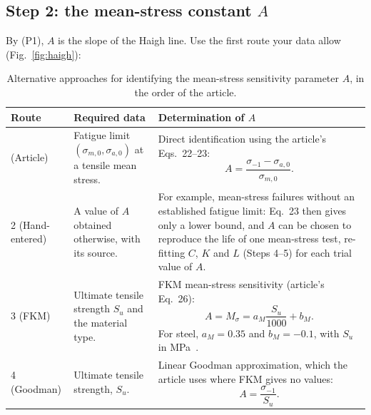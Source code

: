 \documentclass[11pt,a4paper]{article}
\newcommand{\sigm}{\sigma_{-1}}
\newcommand{\Su}{S_u}
\begin{document}
\subsection*{Step 2: the mean-stress constant $A$}
\FloatBarrier
By (P1), $A$ is the slope of the Haigh line. Use the first route your data allow (Fig.~\ref{fig:haigh}):
\begin{table}[h]
\centering
\caption{Alternative approaches for identifying the
mean-stress sensitivity parameter $A$, in the order of the article.}
\label{tab:mean_stress_identification}

\renewcommand{\arraystretch}{1.35}
\setlength{\tabcolsep}{8pt}

\begin{tabularx}{\textwidth}{
    @{}
    >{\centering\arraybackslash}p{}
    >{\raggedright\arraybackslash}p{}
    >{\raggedright\arraybackslash}X
    @{}
}
\toprule
\textbf{Route} &
\textbf{Required data} &
\textbf{Determination of $A$} \\
\midrule

1 (Article)
& Fatigue limit $(\sigma_{m,0},\sigma_{a,0})$
at a tensile mean stress.
& Direct identification using the article's
Eqs.~22--23:
\[
A = \frac{\sigm-\sigma_{a,0}}{\sigma_{m,0}}.
\] \\[-6pt]

\addlinespace[3pt]

2 (Hand-entered)
& A value of $A$ obtained otherwise, with its source.
& For example, mean-stress failures without an established fatigue limit: Eq.~23 then gives only a lower
bound, and $A$ can be chosen to reproduce the life of one mean-stress test, re-fitting $C$, $K$ and $L$
(Steps 4--5) for each trial value of $A$. \\

\midrule

3 (FKM)
& Ultimate tensile strength $\Su$ and the material type.
& FKM mean-stress sensitivity (article's Eq.~26):
\[
A = M_\sigma
  = a_M\frac{\Su}{1000}+b_M.
\]
For steel, $a_M=0.35$ and $b_M=-0.1$,
with $\Su$ in MPa~\cite{fkm}. \\[-6pt]

\addlinespace[3pt]

4 (Goodman)
& Ultimate tensile strength, $\Su$.
& Linear Goodman approximation, which the article uses where FKM gives no values:
\[
A = \frac{\sigm}{\Su}.
\] \\[-6pt]

\bottomrule
\end{tabularx}
\end{table}
\end{document}

